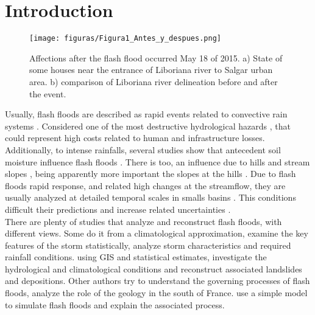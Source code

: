 {%
\section{Introduction}  %

\begin{figure}[t]
    \centering
    \texttt{[image: figuras/Figura1\_Antes\_y\_despues.png]}
    \caption{Affections after the flash flood occurred May 18 of 2015. a) State of some houses near the entrance of Liboriana river to Salgar urban area. b) comparison of Liboriana river delineation before and after the event.}
    \label{fig:Antes_y_Despues}
\end{figure}

Usually, flash floods are described as rapid events related to convective rain systems \citep{Salek2006,Llasat2016,Douinot2016}. Considered one of the most destructive hydrological hazards \citep{Roux2011}, that could represent high costs related to human and infrastructure losses. Additionally, to intense rainfalls, several studies show that antecedent soil moisture influence flash floods \citep{Tramblay2012b,Rodriguez2012,Coustau2012,Wagener2007,Castillo2003}. There is too, an influence due to hills and stream slopes \citep{Doswell2001,Salek2006}, being apparently more important the slopes at the hills \citep{Roux2011,Yatheendradas2008}. Due to flash floods rapid response, and related high changes at the streamflow, they are usually analyzed at detailed temporal scales \citep{Norbiato2008} in smalls basins \citep{Younis2008}.  This conditions difficult their predictions \citep{Hardy2016,Ruiz-Villanueva2013} and increase related uncertainties \citep{Wagener2007}.\\ 

There are plenty of studies that analyze and reconstruct flash floods, with different views.  Some do it from a climatological approximation, \citet{Piper2016} examine the key features of the storm statistically, \citet{Fragoso2012} analyze storm characteristics and required rainfall conditions. \citet{Aronica2012} using GIS and statistical estimates, investigate the hydrological and climatological conditions and reconstruct associated landslides and depositions.   Other authors try to understand the governing processes of flash floods, \citet{Vannier2016} analyze the role of the geology in the south of France. \citet{Adamovic2016} use a simple model to simulate flash floods and explain the associated process. \\ 

}

